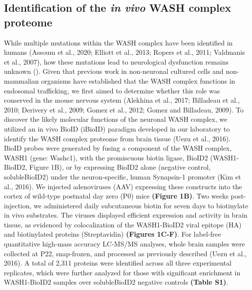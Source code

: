 
\subsection{Identification of the \textit{in vivo} WASH complex proteome}

While multiple mutations within the WASH complex have been identified in humans 
(Assoum et al., 2020; Elliott et al., 2013; Ropers et al., 2011; 
Valdmanis et al., 2007), how these mutations lead to neurological
dysfunction remains unknown (). Given that previous work in
non-neuronal cultured cells and non-mammalian organisms have established that
the WASH complex functions in endosomal trafficking, we first aimed to determine
whether this role was conserved in the mouse nervous system (Alekhina et al.,
2017; Billadeau et al., 2010; Derivery et al., 2009; Gomez et al., 2012; Gomez
and Billadeau, 2009). To discover the likely molecular functions of the neuronal
WASH complex, we utilized an in vivo BioID (iBioID) paradigm developed in our
laboratory to identify the WASH complex proteome from brain tissue (Uezu et al.,
2016). BioID probes were generated by fusing a component of the WASH complex,
WASH1 (gene: Washc1), with the promiscuous biotin ligase, BioID2 (WASH1-BioID2,
Figure 1B), or by expressing BioID2 alone (negative control, solubleBioID2)
under the neuron-specific, human Synapsin-1 promoter (Kim et al., 2016). We
injected adenoviruses (AAV) expressing these constructs into the cortex of
wild-type postnatal day zero (P0) mice \textbf{(Figure 1B)}. Two weeks post-injection, we
administered daily subcutaneous biotin for seven days to biotinylate in vivo
substrates. The viruses displayed efficient expression and activity in brain
tissue, as evidenced by colocalization of the WASH1-BioID2 viral epitope (HA)
and biotinylated proteins (Streptavidin) \textbf{(Figures 1C-F)}. For label-free
quantitative high-mass accuracy LC-MS/MS analyses, whole brain samples were
collected at P22, snap-frozen, and processed as previously described (Uezu et
al., 2016). A total of 2,311 proteins were identified across all three
experimental replicates, which were further analyzed for those with significant
enrichment in WASH1-BioID2 samples over solubleBioID2 negative controls 
\textbf{(Table S1)}. 

